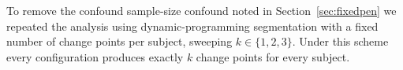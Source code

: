 \documentclass[preprint,12pt,authoryear]{elsarticle}
\newcommand{\dt}{$\Delta T$}
\providecommand{\DIFaddtex}[1]{{\protect\color{blue} \sf #1}} %
\providecommand{\DIFdeltex}[1]{{\protect\color{red} \scriptsize #1}} %
\providecommand{\DIFaddbegin}{} %
\providecommand{\DIFaddend}{} %
\providecommand{\DIFdelbegin}{} %
\providecommand{\DIFdelend}{} %
\providecommand{\DIFadd}[1]{\texorpdfstring{\DIFaddtex{#1}}{#1}} %
\providecommand{\DIFdel}[1]{\texorpdfstring{\DIFdeltex{#1}}{}} %
\newcommand{\DIFscaledelfig}{0.5}
\newlength{\DIFdelgraphicswidth} %
\newlength{\DIFdelgraphicsheight} %
\newcommand{\DIFaddincludegraphics}[2][]{{\color{blue}\fbox{\DIFOincludegraphics[#1]{#2}}}} %
\newcommand{\DIFdelincludegraphics}[2][]{%
\sbox{\DIFdelgraphicsbox}{\DIFOincludegraphics[#1]{#2}}%
\settoboxwidth{\DIFdelgraphicswidth}{\DIFdelgraphicsbox} %
\settoboxtotalheight{\DIFdelgraphicsheight}{\DIFdelgraphicsbox} %
\scalebox{\DIFscaledelfig}{%
\parbox[b]{\DIFdelgraphicswidth}{\usebox{\DIFdelgraphicsbox}\\[-\baselineskip] \rule{\DIFdelgraphicswidth}{0em}}\llap{\resizebox{\DIFdelgraphicswidth}{\DIFdelgraphicsheight}{%
\setlength{\unitlength}{\DIFdelgraphicswidth}%
\begin{picture}(1,1)%
\thicklines\linethickness{2pt} %
{\color[rgb]{1,0,0}\put(0,0){\framebox(1,1){}}}%
{\color[rgb]{1,0,0}\put(0,0){\line( 1,1){1}}}%
{\color[rgb]{1,0,0}\put(0,1){\line(1,-1){1}}}%
\end{picture}%
}\hspace*{3pt}}} %
} %
\DeclareRobustCommand{\DIFaddbegin}{\DIFOaddbegin \let\includegraphics\DIFaddincludegraphics} %
\DeclareRobustCommand{\DIFaddend}{\DIFOaddend \let\includegraphics\DIFOincludegraphics} %
\DeclareRobustCommand{\DIFdelbegin}{\DIFOdelbegin \let\includegraphics\DIFdelincludegraphics} %
\DeclareRobustCommand{\DIFdelend}{\DIFOaddend \let\includegraphics\DIFOincludegraphics} %
\begin{document}
To remove the \DIFdelbegin \DIFdel{confound }\DIFdelend \DIFaddbegin \DIFadd{sample-size confound noted in Section~\ref{sec:fixedpen} }\DIFaddend we repeated the
analysis using dynamic-programming segmentation \citep{jackson2005}
with a fixed number of change points per subject, sweeping
$k \in \{1, 2, 3\}$. Under this scheme every configuration produces
exactly $k$ change points for every subject.

\DIFdelbegin %
\end{document}
